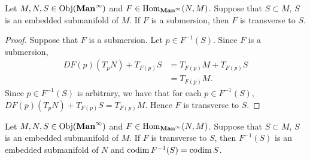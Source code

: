 \documentclass{book}
\begin{document}
	\begin{ex} 
		Let $M, N, S \in \operatorname{Obj}(\operatorname*{\text{\textbf{Man}}^{\infty}})$ and $F \in \operatorname{Hom}_{\operatorname*{\text{\textbf{Man}}^{\infty}}}(N, M)$. Suppose that $S \subset M$, $S$ is an embedded submanifold of $M$. If $F$ is a submersion, then $F$ is transverse to $S$.  
	\end{ex}

	\begin{proof}
		Suppose that $F$ is a submersion. Let $p \in F^{-1}(S)$. Since $F$ is a submersion, 
		\begin{align*}
			DF(p)(T_pN) + T_{F(p)}S
			& = T_{F(p)}M + T_{F(p)}S \\
			& = T_{F(p)}M. 
		\end{align*} 
		Since $p \in F^{-1}(S)$ is arbitrary, we have that for each $p \in F^{-1}(S)$, $DF(p)(T_pN) + T_{F(p)}S = T_{F(p)}M$. Hence $F$ is transverse to $S$.
	\end{proof}

	\begin{ex} 
		Let $M, N, S \in \operatorname{Obj}(\operatorname*{\text{\textbf{Man}}^{\infty}})$ and $F \in \operatorname{Hom}_{\operatorname*{\text{\textbf{Man}}^{\infty}}}(N, M)$. Suppose that $S \subset M$, $S$ is an embedded submanifold of $M$. If $F$ is transverse to $S$, then $F^{-1}(S)$ is an embedded submanifold of $N$ and $\operatorname{codim} F^{-1}(S) = \operatorname{codim} S$. \\
	\end{ex}
\end{document}
